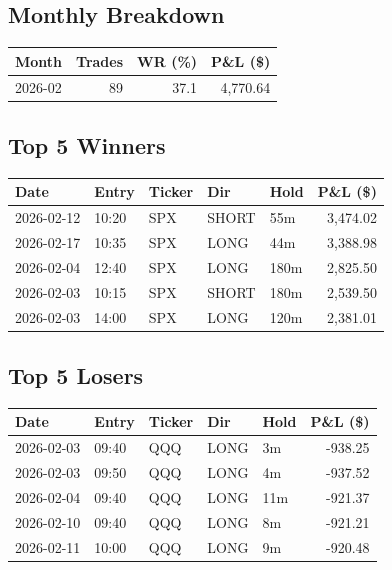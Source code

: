 \documentclass[11pt,a4paper,twoside]{article}
\begin{document}
\subsection{Monthly Breakdown}
\noindent\begin{center}
\begin{tabular}{>{\color{txtmain}}l rrr}
\toprule
\rowcolor{cardbg}
\textbf{Month} & \textbf{Trades} & \textbf{WR (\%)} & \textbf{P\&L (\$)} \\
\midrule
2026-02 & 89 & 37.1 & \textcolor{wingreen}{4,770.64} \\
\bottomrule
\end{tabular}
\end{center}
\subsection{Top 5 Winners}
\noindent\begin{center}
\begin{tabular}{>{\color{txtmain}}l llll r}
\toprule
\rowcolor{cardbg}
\textbf{Date} & \textbf{Entry} & \textbf{Ticker} & \textbf{Dir} & \textbf{Hold} & \textbf{P\&L (\$)} \\
\midrule
2026-02-12 & 10:20 & SPX & SHORT & 55m & \textcolor{wingreen}{3,474.02} \\
2026-02-17 & 10:35 & SPX & LONG & 44m & \textcolor{wingreen}{3,388.98} \\
2026-02-04 & 12:40 & SPX & LONG & 180m & \textcolor{wingreen}{2,825.50} \\
2026-02-03 & 10:15 & SPX & SHORT & 180m & \textcolor{wingreen}{2,539.50} \\
2026-02-03 & 14:00 & SPX & LONG & 120m & \textcolor{wingreen}{2,381.01} \\
\bottomrule
\end{tabular}
\end{center}
\subsection{Top 5 Losers}
\noindent\begin{center}
\begin{tabular}{>{\color{txtmain}}l llll r}
\toprule
\rowcolor{cardbg}
\textbf{Date} & \textbf{Entry} & \textbf{Ticker} & \textbf{Dir} & \textbf{Hold} & \textbf{P\&L (\$)} \\
\midrule
2026-02-03 & 09:40 & QQQ & LONG & 3m & \textcolor{lossred}{-938.25} \\
2026-02-03 & 09:50 & QQQ & LONG & 4m & \textcolor{lossred}{-937.52} \\
2026-02-04 & 09:40 & QQQ & LONG & 11m & \textcolor{lossred}{-921.37} \\
2026-02-10 & 09:40 & QQQ & LONG & 8m & \textcolor{lossred}{-921.21} \\
2026-02-11 & 10:00 & QQQ & LONG & 9m & \textcolor{lossred}{-920.48} \\
\bottomrule
\end{tabular}
\end{center}
\clearpage
\end{document}
